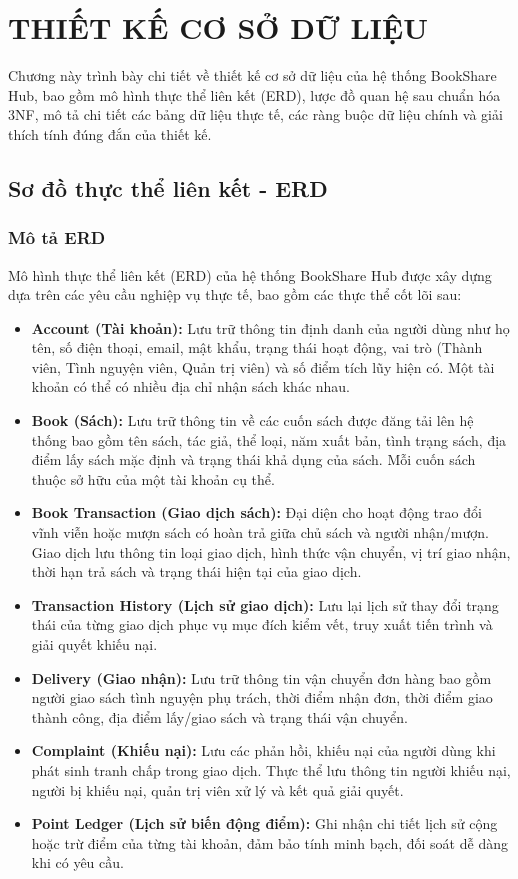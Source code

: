 
\section{THIẾT KẾ CƠ SỞ DỮ LIỆU}

Chương này trình bày chi tiết về thiết kế cơ sở dữ liệu của hệ thống BookShare Hub, bao gồm mô hình thực thể liên kết (ERD), lược đồ quan hệ sau chuẩn hóa 3NF, mô tả chi tiết các bảng dữ liệu thực tế, các ràng buộc dữ liệu chính và giải thích tính đúng đắn của thiết kế.

\subsection{Sơ đồ thực thể liên kết - ERD}

\subsubsection{Mô tả ERD}

Mô hình thực thể liên kết (ERD) của hệ thống BookShare Hub được xây dựng dựa trên các yêu cầu nghiệp vụ thực tế, bao gồm các thực thể cốt lõi sau:
\begin{itemize}
    \item \textbf{Account (Tài khoản):} Lưu trữ thông tin định danh của người dùng như họ tên, số điện thoại, email, mật khẩu, trạng thái hoạt động, vai trò (Thành viên, Tình nguyện viên, Quản trị viên) và số điểm tích lũy hiện có. Một tài khoản có thể có nhiều địa chỉ nhận sách khác nhau.
    \item \textbf{Book (Sách):} Lưu trữ thông tin về các cuốn sách được đăng tải lên hệ thống bao gồm tên sách, tác giả, thể loại, năm xuất bản, tình trạng sách, địa điểm lấy sách mặc định và trạng thái khả dụng của sách. Mỗi cuốn sách thuộc sở hữu của một tài khoản cụ thể.
    \item \textbf{Book Transaction (Giao dịch sách):} Đại diện cho hoạt động trao đổi vĩnh viễn hoặc mượn sách có hoàn trả giữa chủ sách và người nhận/mượn. Giao dịch lưu thông tin loại giao dịch, hình thức vận chuyển, vị trí giao nhận, thời hạn trả sách và trạng thái hiện tại của giao dịch.
    \item \textbf{Transaction History (Lịch sử giao dịch):} Lưu lại lịch sử thay đổi trạng thái của từng giao dịch phục vụ mục đích kiểm vết, truy xuất tiến trình và giải quyết khiếu nại.
    \item \textbf{Delivery (Giao nhận):} Lưu trữ thông tin vận chuyển đơn hàng bao gồm người giao sách tình nguyện phụ trách, thời điểm nhận đơn, thời điểm giao thành công, địa điểm lấy/giao sách và trạng thái vận chuyển.
    \item \textbf{Complaint (Khiếu nại):} Lưu các phản hồi, khiếu nại của người dùng khi phát sinh tranh chấp trong giao dịch. Thực thể lưu thông tin người khiếu nại, người bị khiếu nại, quản trị viên xử lý và kết quả giải quyết.
    \item \textbf{Point Ledger (Lịch sử biến động điểm):} Ghi nhận chi tiết lịch sử cộng hoặc trừ điểm của từng tài khoản, đảm bảo tính minh bạch, đối soát dễ dàng khi có yêu cầu.
\end{itemize}


